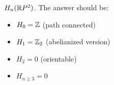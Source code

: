         \begin{remark}[Exam]
            $H_n(\mathbb{R} P^2)$. The answer should be:
            \begin{itemize}
                \item $H_0 = \mathbb{Z}$ (path connected)
                \item $H_1 = \mathbb{Z}_2$ (abelianized version)
                \item $H_2 = 0$ (orientable)
                \item $H_{n\ge 3} = 0$ 
            \end{itemize}
        \end{remark}
